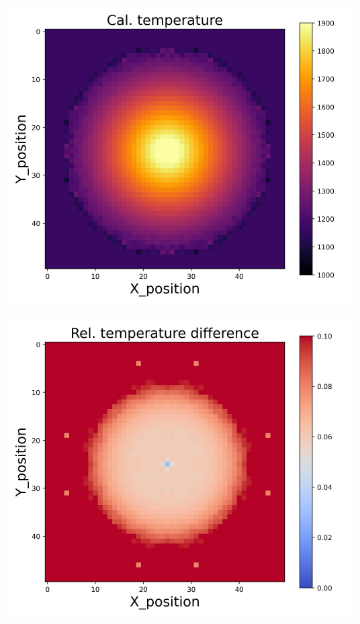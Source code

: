 \begin{figure}[htbp]
    \centering
    \begin{minipage}{\textwidth}
        \centering
        \begin{subfigure}{0.325\textwidth}
            \centering
            \includegraphics[width=\textwidth]{figures/raw_data/21/lin_square/T_cal.jpg}
        \end{subfigure}
        \begin{subfigure}{0.325\textwidth}
            \centering
            \includegraphics[width=\textwidth]{figures/raw_data/21/lin_square/T_bias.jpg}

\end{subfigure}
\end{minipage}
\end{figure}
